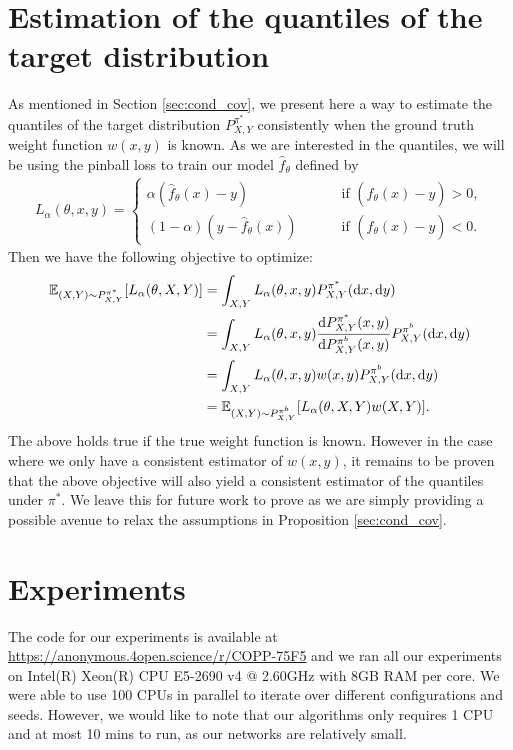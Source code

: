 \section{Estimation of the quantiles of the target distribution}\label{sec:estimating_target_quantiles}
As mentioned in Section \ref{sec:cond_cov}, we present here a way to estimate the quantiles of the target distribution $P_{X,Y}^{\pi^*}$ consistently when the ground truth weight function $w(x, y)$ is known. As we are interested in the quantiles, we will be using the pinball loss to train our model $\hat{f}_{\theta}$ defined by
\begin{align}
    L_{\alpha}(\theta, x, y) = \begin{cases}
         \alpha (\hat{f}_{\theta}(x)-y) \qquad &\text{ if } (\hat{f}_{\theta}(x)-y) > 0, \\
         (1-\alpha) (y -\hat{f}_{\theta}(x)) \qquad &\text{ if } (\hat{f}_{\theta}(x)-y) < 0.
    \end{cases} \nonumber
\end{align}
Then we have the following objective to optimize:
\begin{align}
\mathbb{E}_{(X,Y)\sim P^{\pi^*}_{X,Y}}[L_\alpha(\theta, X, Y)] &= \int_{X,Y} L_\alpha(\theta, x, y) P_{X,Y}^{\pi^*}(\mathrm{d}x,\mathrm{d}y) \nonumber \\
&= \int_{X,Y} L_\alpha(\theta, x, y) \frac{\mathrm{d}P_{X, Y}^{\pi^*}(x, y)}{\mathrm{d}P_{X,Y}^{\pi^b}(x, y)} P_{X,Y}^{\pi^b}(\mathrm{d}x,\mathrm{d} y) \nonumber \\
&= \int_{X,Y} L_\alpha(\theta, x, y) w(x, y) P_{X,Y}^{\pi^b}(\mathrm{d}x,\mathrm{d}y)\nonumber\\
&= \mathbb{E}_{(X,Y)\sim P^{\pi^b}_{X,Y}}[L_\alpha(\theta, X, Y) w(X, Y)]. \nonumber
\end{align}
The above holds true if the true weight function is known. However in the case where we only have a consistent estimator of $w(x, y)$, it remains to be proven that the above objective will also yield a consistent estimator of the quantiles under $\pi^*$. We leave this for future work to prove as we are simply providing a possible avenue to relax the assumptions in Proposition \ref{sec:cond_cov}. 



\newpage
\section{Experiments}\label{sec:exps_app}
The code for our experiments is available at \url{https://anonymous.4open.science/r/COPP-75F5} and we ran all our experiments on Intel(R) Xeon(R) CPU E5-2690 v4 @ 2.60GHz with 8GB RAM per core. We were able to use 100 CPUs in parallel to iterate over different configurations and seeds. However, we would like to note that our algorithms only requires 1 CPU and at most 10 mins to run, as our networks are relatively small.
